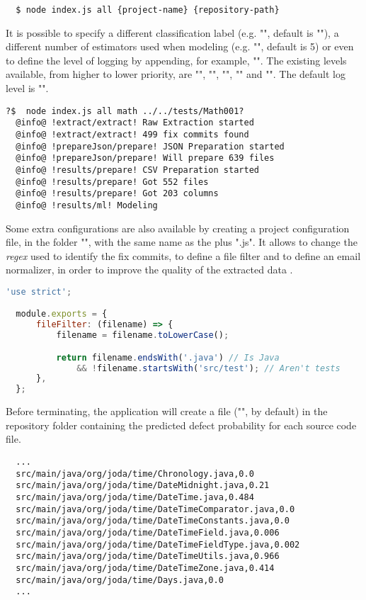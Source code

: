 \begin{lstlisting}
  $ node index.js all {project-name} {repository-path}
\end{lstlisting}

It is possible to specify a different classification label (e.g. "", default is ""), 
a different number of estimators used when modeling (e.g. "", default is 5) or even
to define the level of logging by appending, for example, "". The existing levels available, from higher to lower priority, are
"", "", "", "" and "". The default log level is "".

\begin{lstlisting}[style=npmlog]
  ?$  node index.js all math ../../tests/Math001?
  @info@ !extract/extract! Raw Extraction started
  @info@ !extract/extract! 499 fix commits found
  @info@ !prepareJson/prepare! JSON Preparation started
  @info@ !prepareJson/prepare! Will prepare 639 files
  @info@ !results/prepare! CSV Preparation started
  @info@ !results/prepare! Got 552 files
  @info@ !results/prepare! Got 203 columns
  @info@ !results/ml! Modeling
\end{lstlisting}

Some extra configurations are also available by creating a project configuration file, in the folder "", with the same name as the  plus ".js".
It allows to change the \emph{regex} used to identify the fix commits, to define a file filter and to define an email normalizer, in order to improve the quality of the extracted data .

\begin{lstlisting}[language=Javascript]
  'use strict';

  module.exports = {
      fileFilter: (filename) => {
          filename = filename.toLowerCase();

          return filename.endsWith('.java') // Is Java
              && !filename.startsWith('src/test'); // Aren't tests
      },
  };
\end{lstlisting}

Before terminating, the application will create a file ("", by default) in the repository folder containing the predicted defect probability for each source code file.

\begin{lstlisting}
  ...
  src/main/java/org/joda/time/Chronology.java,0.0
  src/main/java/org/joda/time/DateMidnight.java,0.21
  src/main/java/org/joda/time/DateTime.java,0.484
  src/main/java/org/joda/time/DateTimeComparator.java,0.0
  src/main/java/org/joda/time/DateTimeConstants.java,0.0
  src/main/java/org/joda/time/DateTimeField.java,0.006
  src/main/java/org/joda/time/DateTimeFieldType.java,0.002
  src/main/java/org/joda/time/DateTimeUtils.java,0.966
  src/main/java/org/joda/time/DateTimeZone.java,0.414
  src/main/java/org/joda/time/Days.java,0.0
  ...
\end{lstlisting}

